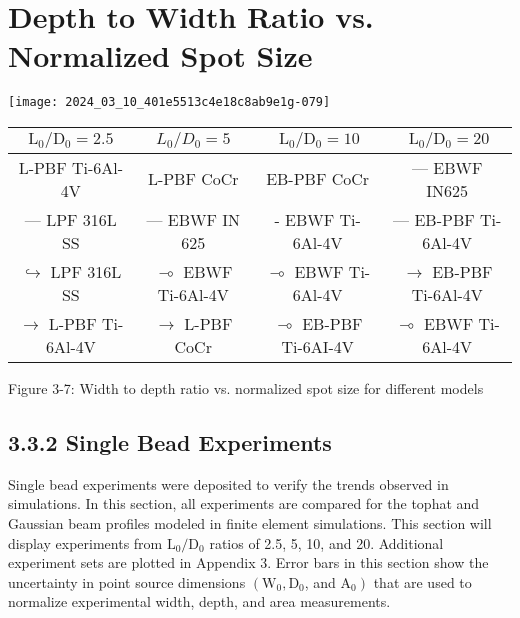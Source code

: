 \documentclass[10pt]{article}
\begin{document}
\section*{Depth to Width Ratio vs. Normalized Spot Size}
\begin{center}
\texttt{[image: 2024\_03\_10\_401e5513c4e18c8ab9e1g-079]}
\end{center}

\begin{center}
\begin{tabular}{|c|c|c|c|}
\hline
$\mathrm{L}_{0} / \mathrm{D}_{0}=2.5$ & $L_{0} / D_{0}=5$ & $\mathrm{~L}_{0} / \mathrm{D}_{0}=10$ & $\mathrm{~L}_{0} / \mathrm{D}_{0}=20$ \\
\hline
L-PBF Ti-6Al-4V & L-PBF CoCr & EB-PBF CoCr & — EBWF IN625 \\
\hline
— LPF 316L SS & — EBWF IN 625 & - EBWF Ti-6Al-4V & — EB-PBF Ti-6Al-4V \\
\hline
$\hookrightarrow$ LPF 316L SS & $\multimap$ EBWF Ti-6Al-4V & $\multimap$ EBWF Ti-6Al-4V & $\rightarrow$ EB-PBF Ti-6Al-4V \\
\hline
$\rightarrow$ L-PBF Ti-6Al-4V & $\rightarrow$ L-PBF CoCr & $\multimap$ EB-PBF Ti-6AI-4V & $\multimap$ EBWF Ti-6Al-4V \\
\hline
\end{tabular}
\end{center}

Figure 3-7: Width to depth ratio vs. normalized spot size for different models

\subsection*{3.3.2 Single Bead Experiments}
Single bead experiments were deposited to verify the trends observed in simulations. In this section, all experiments are compared for the tophat and Gaussian beam profiles modeled in finite element simulations. This section will display experiments from $\mathrm{L}_{0} / \mathrm{D}_{0}$ ratios of 2.5, 5, 10, and 20. Additional experiment sets are plotted in Appendix 3. Error bars in this section show the uncertainty in point source dimensions $\left(\mathrm{W}_{0}, \mathrm{D}_{0}\right.$, and $\left.\mathrm{A}_{0}\right)$ that are used to normalize experimental width, depth, and area measurements.
\end{document}

